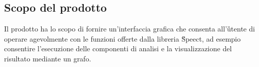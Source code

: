 \subsection{Scopo del prodotto}
Il prodotto ha lo scopo di fornire un'interfaccia grafica che consenta all'\G{utente} di operare agevolmente con le funzioni offerte
dalla libreria \G{Speect}, ad esempio  consentire l'esecuzione delle componenti di analisi e la 
visualizzazione del risultato mediante un grafo.